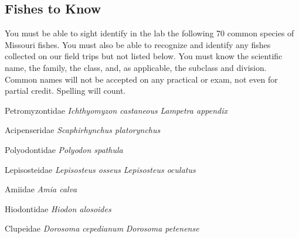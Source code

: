 \documentclass[11pt, hidelinks]{exam}
\begin{document}
\subsection*{Fishes to Know}

You must be able to sight identify in the lab the following 70 common species of Missouri fishes.  You must also be able to recognize and identify any fishes collected on our field trips but not listed below.  You must know the scientific name, the family, the class, and, as applicable, the subclass and division.  Common names will not be accepted on any practical or exam, not even for 
partial credit.  Spelling will count.

\noindent\begin{multicols}{2}
Petromyzontidae\newline
	\hspace*{1em}\textit{Ichthyomyzon castaneous}\newline
	\hspace*{1em}\textit{Lampetra appendix}

Acipenseridae\newline
	\hspace*{1em}\textit{Scaphirhynchus platorynchus}

Polyodontidae\newline
	\hspace*{1em}\textit{Polyodon spathula}

Lepisosteidae\newline
	\hspace*{1em}\textit{Lepisosteus osseus}\newline
	\hspace*{1em}\textit{Lepisosteus oculatus}

Amiidae\newline
	\hspace*{1em}\textit{Amia calva}

Hiodontidae\newline
	\hspace*{1em}\textit{Hiodon alosoides}

Clupeidae\newline
	\hspace*{1em}\textit{Dorosoma cepedianum}\newline
	\hspace*{1em}\textit{Dorosoma petenense}


\end{multicols}
\end{document}
